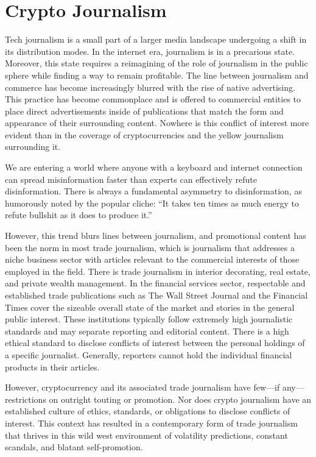 \chapter{Crypto Journalism}


Tech journalism is a small part of a larger media landscape undergoing a shift
in its distribution modes. In the internet era, journalism is in a precarious
state. Moreover, this state requires a reimagining of the role of journalism in
the public sphere while finding a way to remain profitable. The line between
journalism and commerce has become increasingly blurred with the rise of native
advertising. This practice has become commonplace and is offered to commercial
entities to place direct advertisements inside of publications that match the
form and appearance of their surrounding content. Nowhere is this conflict of
interest more evident than in the coverage of cryptocurrencies and the yellow
journalism surrounding it.

We are entering a world where anyone with a keyboard and internet connection can
spread misinformation faster than experts can effectively refute disinformation.
There is always a fundamental asymmetry to disinformation, as humorously noted
by the popular cliche: ``It takes ten times as much energy to refute bullshit as
it does to produce it.''

However, this trend blurs lines between journalism, and promotional content has
been the norm in most trade journalism, which is journalism that addresses a
niche business sector with articles relevant to the commercial interests of
those employed in the field. There is trade journalism in interior decorating,
real estate, and private wealth management. In the financial services sector,
respectable and established trade publications such as The Wall Street Journal
and the Financial Times cover the sizeable overall state of the market and
stories in the general public interest. These institutions typically follow
extremely high journalistic standards and may separate reporting and editorial
content. There is a high ethical standard to disclose conflicts of interest
between the personal holdings of a specific journalist. Generally, reporters
cannot hold the individual financial products in their articles.

However, cryptocurrency and its associated trade journalism have few—if
any—restrictions on outright touting or promotion. Nor does crypto journalism
have an established culture of ethics, standards, or obligations to disclose
conflicts of interest. This context has resulted in a contemporary form of trade
journalism that thrives in this wild west environment of volatility predictions,
constant scandals, and blatant self-promotion.

